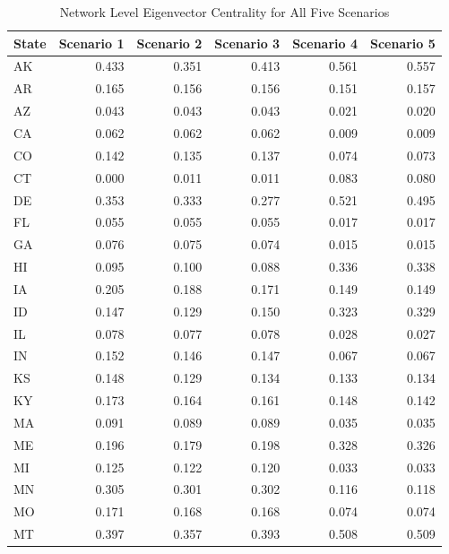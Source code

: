 \documentclass[]{article}
\begin{document}
\begin{table}[!h]

\caption{\label{tab:unnamed-chunk-49}Network Level Eigenvector Centrality for All Five Scenarios}
\centering
\begin{tabular}{l|r|r|r|r|r}
\hline
State & Scenario 1 & Scenario 2 & Scenario 3 & Scenario 4 & Scenario 5\\
\hline
\rowcolor{gray!6}  AK & 0.433 & 0.351 & 0.413 & 0.561 & 0.557\\
\hline
AR & 0.165 & 0.156 & 0.156 & 0.151 & 0.157\\
\hline
\rowcolor{gray!6}  AZ & 0.043 & 0.043 & 0.043 & 0.021 & 0.020\\
\hline
CA & 0.062 & 0.062 & 0.062 & 0.009 & 0.009\\
\hline
\rowcolor{gray!6}  CO & 0.142 & 0.135 & 0.137 & 0.074 & 0.073\\
\hline
CT & 0.000 & 0.011 & 0.011 & 0.083 & 0.080\\
\hline
\rowcolor{gray!6}  DE & 0.353 & 0.333 & 0.277 & 0.521 & 0.495\\
\hline
FL & 0.055 & 0.055 & 0.055 & 0.017 & 0.017\\
\hline
\rowcolor{gray!6}  GA & 0.076 & 0.075 & 0.074 & 0.015 & 0.015\\
\hline
HI & 0.095 & 0.100 & 0.088 & 0.336 & 0.338\\
\hline
\rowcolor{gray!6}  IA & 0.205 & 0.188 & 0.171 & 0.149 & 0.149\\
\hline
ID & 0.147 & 0.129 & 0.150 & 0.323 & 0.329\\
\hline
\rowcolor{gray!6}  IL & 0.078 & 0.077 & 0.078 & 0.028 & 0.027\\
\hline
IN & 0.152 & 0.146 & 0.147 & 0.067 & 0.067\\
\hline
\rowcolor{gray!6}  KS & 0.148 & 0.129 & 0.134 & 0.133 & 0.134\\
\hline
KY & 0.173 & 0.164 & 0.161 & 0.148 & 0.142\\
\hline
\rowcolor{gray!6}  MA & 0.091 & 0.089 & 0.089 & 0.035 & 0.035\\
\hline
ME & 0.196 & 0.179 & 0.198 & 0.328 & 0.326\\
\hline
\rowcolor{gray!6}  MI & 0.125 & 0.122 & 0.120 & 0.033 & 0.033\\
\hline
MN & 0.305 & 0.301 & 0.302 & 0.116 & 0.118\\
\hline
\rowcolor{gray!6}  MO & 0.171 & 0.168 & 0.168 & 0.074 & 0.074\\
\hline
MT & 0.397 & 0.357 & 0.393 & 0.508 & 0.509\\

\end{tabular}
\end{table}
\end{document}
